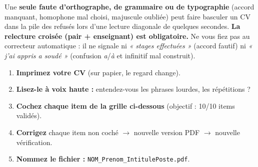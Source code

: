 \documentclass[11pt]{article}
\begin{document}
\begin{attention}
Une \textbf{seule faute d'orthographe, de grammaire ou de typographie} (accord manquant, homophone mal choisi, majuscule oubliée) peut faire basculer un CV dans la pile des refusés lors d'une lecture diagonale de quelques secondes. \textbf{La relecture croisée (pair + enseignant) est obligatoire.} Ne vous fiez pas au correcteur automatique : il ne signale ni \emph{« stages effectuées »} (accord fautif) ni \emph{« j'ai appris a soudé »} (confusion \emph{a}/\emph{à} et infinitif mal construit).
\end{attention}

\begin{methode}
\begin{enumerate}
  \item \textbf{Imprimez votre CV} (sur papier, le regard change).
  \item \textbf{Lisez-le à voix haute :} entendez-vous les phrases lourdes, les répétitions ?
  \item \textbf{Cochez chaque item de la grille ci-dessous} (objectif : 10/10 items validés).
  \item \textbf{Corrigez} chaque item non coché $\rightarrow$ nouvelle version PDF $\rightarrow$ nouvelle vérification.
  \item \textbf{Nommez le fichier :} \texttt{NOM\_Prenom\_IntitulePoste.pdf}.
\end{enumerate}
\end{methode}
\end{document}
